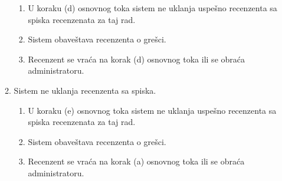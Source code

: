 \documentclass[a4paper]{article}
\begin{document}
\begin{itemize}
\begin{enumerate}
\begin{enumerate}
                \item U koraku (d) osnovnog toka sistem ne uklanja uspešno recenzenta sa spiska recenzenata za taj rad.
                \item Sistem obaveštava recenzenta o grešci.
                \item Recenzent se vraća na korak (d) osnovnog toka ili se obraća administratoru.
            \end{enumerate}
            \item Sistem ne uklanja recenzenta sa spiska.
            \begin{enumerate}
                \item U koraku (e) osnovnog toka sistem ne uklanja uspešno recenzenta sa spiska recenzenata za taj rad.
                \item Sistem obaveštava recenzenta o grešci.
                \item Recenzent se vraća na korak (a) osnovnog toka ili se obraća administratoru.
            \end{enumerate}
        \end{enumerate}
\end{itemize}

\newpage
\end{document}
